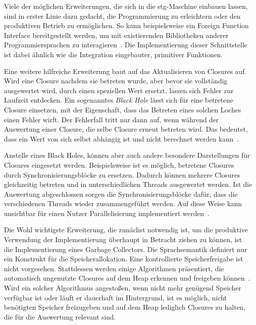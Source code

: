 Viele der möglichen Erweiterungen, die sich in die \gls{stg}-Maschine einbauen lassen, sind in erster Linie dazu gedacht, die Programmierung zu erleichtern oder den produktiven Betrieb zu ermöglichen.
So kann beispielsweise ein Foreign Function Interface bereitgestellt werden, um mit existierenden Bibliotheken anderer Programmiersprachen zu interagieren~\cite{Jones_TacklingAwkwardSquad}.
Die Implementierung dieser Schnittstelle ist dabei ähnlich wie die Integration eingebauter, primitiver Funktionen.

Eine weitere hilfreiche Erweiterung baut auf das Aktualisieren von Closures auf.
Wird eine Closure nachdem sie betreten wurde, aber bevor sie vollständig ausgewertet wird, durch einen speziellen Wert ersetzt, lassen sich Fehler zur Laufzeit entdecken.
Ein sogenanntes \textit{Black Hole} lässt sich für eine betretene Closure einsetzen, mit der Eigenschaft, dass das Betreten eines solchen Loches einen Fehler wirft.
Der Fehlerfall tritt nur dann auf, wenn während der Auswertung einer Closure, die selbe Closure erneut betreten wird.
Das bedeutet, dass ein Wert von sich selbst abhängig ist und nicht berechnet werden kann~\cite{Jones_StockHardwareSTG}.

Anstelle eines Black Holes, können aber auch andere besondere Darstellungen für Closures eingesetzt werden.
Beispielsweise ist es möglich, betretene Closures durch Synchronisierungsblöcke zu ersetzen.
Dadurch können mehrere Closures gleichzeitig betreten und in unterschiedlichen Threads ausgewertet werden.
Ist die Auswertung abgeschlossen sorgen die Synchronisierungsblöcke dafür, dass die verschiedenen Threads wieder zusammengeführt werden.
Auf diese Weise kann unsichtbar für einen Nutzer Parallelisierung implementiert werden~\cite{Jones_StockHardwareSTG}.

Die Wohl wichtigste Erweiterung, die zunächst notwendig ist, um die produktive Verwendung der Implementierung überhaupt in Betracht ziehen zu können, ist die Implementierung eines Garbage Collectors.
Die Sprachsemantik definiert nur ein Konstrukt für die Speicherallokation.
Eine kontrollierte Speicherfreigabe ist nicht vorgesehen.
Stattdessen werden einige Algorithmen präsentiert, die automatisch ungenutzte Closures auf dem Heap erkennen und freigeben können~\cite{Jones_StockHardwareSTG}.
Wird ein solcher Algorithmus angestoßen, wenn nicht mehr genügend Speicher verfügbar ist oder läuft er dauerhaft im Hintergrund, ist es möglich, nicht benötigten Speicher freizugeben und auf dem Heap lediglich Closures zu halten, die für die Auswertung relevant sind.

